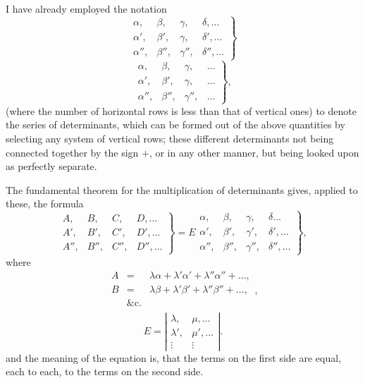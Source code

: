 \documentclass[11pt,a4paper]{book}
\begin{document}
I have already employed the notation
\[
\left.
\begin{array}{cccc}
\alpha, & \beta, & \gamma, & \delta, \ldots \\
\alpha', & \beta', & \gamma, & \delta', \ldots \\
\alpha'', & \beta'', & \gamma'', & \delta'', \ldots
\end{array}
\right\}
\tag{1}
\]
\[
\left.
\begin{array}{cccc}
\alpha, & \beta, & \gamma, & \ldots \\
\alpha', & \beta', & \gamma, & \ldots \\
\alpha'', & \beta'', & \gamma'', & \ldots
\end{array}
\right\}
\tag{2},
\]
(where the number of horizontal rows is less than that of vertical ones) to denote
the series of determinants, which can be formed out of the above quantities by selecting any system of vertical
rows; these different determinants not being connected together by the sign $+$, or in
any other manner, but being looked upon as perfectly separate.

The fundamental theorem for the multiplication of determinants gives, applied to
these, the formula
\[
\left.
\begin{array}{cccc}
A, & B, & C, & D, \ldots \\
A', & B', & C', & D', \ldots \\
A'', & B'', & C'', & D'', \ldots
\end{array}
\right\}
= E
\left.
\begin{array}{cccc}
\alpha, & \beta, & \gamma, & \delta \ldots \\
\alpha', & \beta', & \gamma', & \delta', \ldots \\
\alpha'', & \beta'', & \gamma'', & \delta'', \ldots
\end{array}
\right\}
\tag{3},
\]
where
\[
\begin{array}{rcl}
A &=& \lambda\alpha + \lambda'\alpha' + \lambda''\alpha'' + \ldots, \\
B &=& \lambda\beta + \lambda'\beta' + \lambda''\beta'' + \ldots, \\
&\&\text{c.} \\
\end{array}
\tag{4},
\]
\[
E = \left|\begin{array}{cc}
\lambda, & \mu, \ldots \\
\lambda', & \mu', \ldots \\
\vdots & \vdots
\end{array}\right|
\tag{5}.
\]
and the meaning of the equation is, that the terms on the first side are equal, each
to each, to the terms on the second side.
\end{document}
